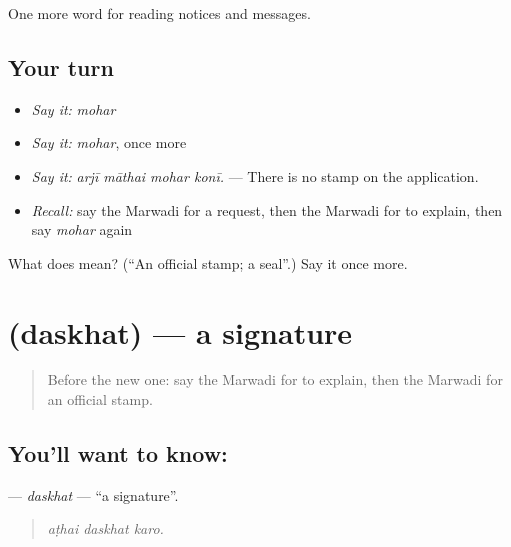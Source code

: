 \begin{grammarlens}[title={What you've built}]
One more word for reading notices and messages.
\end{grammarlens}

\subsection*{Your turn}
\begin{itemize}
\raggedright
  \item \emph{Say it:} \emph{mohar}
  \item \emph{Say it:} \emph{mohar}, once more
  \item \emph{Say it:} \emph{arjī māthai mohar konī.} — There is no stamp on the application.
  \item \emph{Recall:} say the Marwadi for a request, then the Marwadi for to explain, then say \emph{mohar} again
\end{itemize}

\begin{tcolorbox}[breakable,colback=teal!4,colframe=teal!35!black,title={Before you move on}]
What does  mean? (\textquotedblleft{}An official stamp; a seal\textquotedblright{}.) Say it once more.
\end{tcolorbox}
\section[\texorpdfstring{\mw{दसखत} (daskhat)}{दसखत (daskhat)}]{ (daskhat) — a signature}

\label{lesson:MW-C199-daskhat}



\begin{quote}
Before the new one: say the Marwadi for to explain, then the Marwadi for an official stamp.
\end{quote}

\subsection*{You'll want to know: }
\textbf{} — \emph{daskhat} — \textquotedblleft{}a signature\textquotedblright{}.

\begin{quote}
  
\end{quote}

\begin{quote}
\emph{aṭhai daskhat karo.}
\end{quote}

